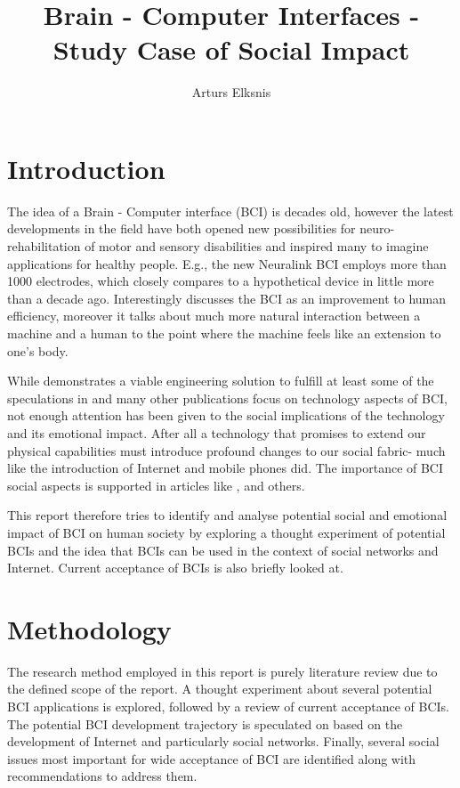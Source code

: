 \documentclass[fleqn,11pt]{olplainarticle}
\title{Brain - Computer Interfaces - Study Case of Social Impact}
\author[1]{Arturs Elksnis}
\begin{document}
\flushbottom
\maketitle
\thispagestyle{empty}

\section{Introduction}
The idea of a Brain - Computer interface (BCI) is decades old, however the latest developments in the field have both opened new possibilities for neuro-rehabilitation of motor and sensory disabilities and inspired many to imagine applications for healthy people. E.g., the new Neuralink BCI \cite{musk2019integrated} employs more than 1000 electrodes, which closely compares to a hypothetical device in \cite{schalk2008brain} little more than a decade ago. Interestingly \cite{schalk2008brain} discusses the BCI as an improvement to human efficiency, moreover it talks about much more natural interaction between a machine and a human to the point where the machine feels like an extension to one's body.

While \cite{musk2019integrated} demonstrates a viable engineering solution to fulfill at least some of the speculations in \cite{schalk2008brain} and many other publications focus on technology aspects of BCI, not enough attention has been given to the social implications of the technology and its emotional impact. After all a technology that promises to extend our physical capabilities must introduce profound changes to our social fabric- much like the introduction of Internet and mobile phones did. The importance of BCI social aspects is supported in articles like \cite{sexton2015overlooked}, \cite{kogel2019using} and others.

This report therefore tries to identify and analyse potential social and emotional impact of BCI on human society by exploring a thought experiment of potential BCIs and the idea that BCIs can be used in the context of social networks and Internet. Current acceptance of BCIs is also briefly looked at.

\section{Methodology}
The research method employed in this report is purely literature review due to the defined scope of the report. A thought experiment about several potential BCI applications is explored, followed by a review of current acceptance of BCIs. The potential BCI development trajectory is speculated on based on the development of Internet and particularly social networks. Finally, several social issues most important for wide acceptance of BCI are identified along with recommendations to address them.
\end{document}
